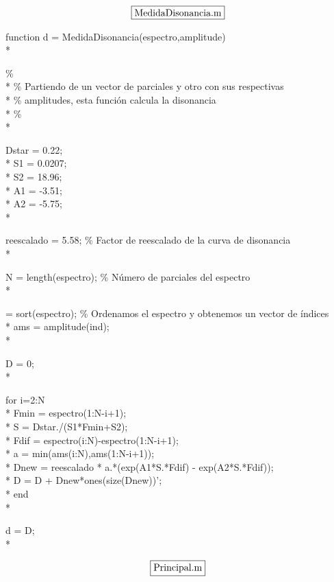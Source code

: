 \documentclass[11pt,a4paper]{article}
\begin{document}
$$
\boxed{
\textnormal{MedidaDisonancia.m}
}
$$

\noindent function d = MedidaDisonancia(espectro,amplitude)\\*

\noindent\% \\*
\% Partiendo de un vector de parciales y otro con sus respectivas \\*
\% amplitudes, esta función calcula la disonancia \\*
\% \\*

\noindent Dstar = 0.22; \\*
\noindent S1 = 0.0207;\\*
\noindent S2 = 18.96; \\*
\noindent A1 = -3.51;\\*
\noindent A2 = -5.75;\\*

\noindent reescalado = 5.58;     \% Factor de reescalado de la curva de disonancia\\*

\noindent N = length(espectro);  \% Número de parciales del espectro\\*

 = sort(espectro);  \% Ordenamos el espectro y obtenemos un vector de índices\\*
\noindent ams = amplitude(ind);\\*

\noindent D = 0;\\*

\noindent for i=2:N\\*
\noindent   Fmin = espectro(1:N-i+1);\\*
\noindent   S = Dstar./(S1*Fmin+S2);\\*
\noindent   Fdif = espectro(i:N)-espectro(1:N-i+1);\\*
\noindent   a = min(ams(i:N),ams(1:N-i+1));\\*
\noindent   Dnew = reescalado * a.*(exp(A1*S.*Fdif) - exp(A2*S.*Fdif));\\*
\noindent   D = D + Dnew*ones(size(Dnew))';\\*
\noindent end\\*

\noindent d = D;\\*







$$
\boxed{
\textnormal{Principal.m}
}
$$
\end{document}

